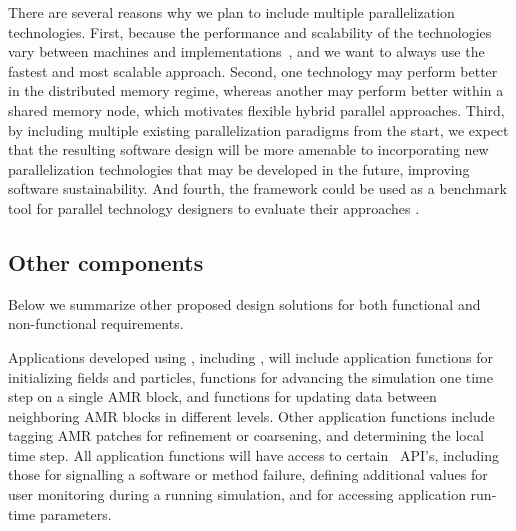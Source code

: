 \documentclass[11pt,letterpaper]{article}
\begin{document}
There are several reasons why we plan to include multiple
parallelization technologies.  First, because the performance and
scalability of the technologies vary between machines and
implementations~\cite{MaTa09}, and we want to always use the fastest
and most scalable approach.  Second, one technology may perform better
in the distributed memory regime, whereas another may perform better
within a shared memory node, which motivates flexible hybrid parallel
approaches.  Third, by including multiple existing parallelization
paradigms from the start, we expect that the resulting software design
will be more amenable to incorporating new parallelization
technologies that may be developed in the future, improving software
sustainability.  And fourth, the framework could be used as a
benchmark tool for parallel technology designers to evaluate their
approaches \cite{WeSu07}.



\subsection{Other components} \label{ss:design-other}

Below we summarize other proposed design solutions for both functional
and non-functional requirements.

%
Applications developed using \cello, including \enzoii, will include
application functions for initializing fields and particles, functions
for advancing the simulation one time step on a single AMR block, and
functions for updating data between neighboring AMR blocks in
different levels.  Other application functions include tagging AMR
patches for refinement or coarsening, and determining the local time
step.  All application functions will have access to certain \cello\
API's, including those for signalling a software or method failure,
defining additional values for user monitoring during a running
simulation, and for accessing application run-time parameters.
\end{document}
